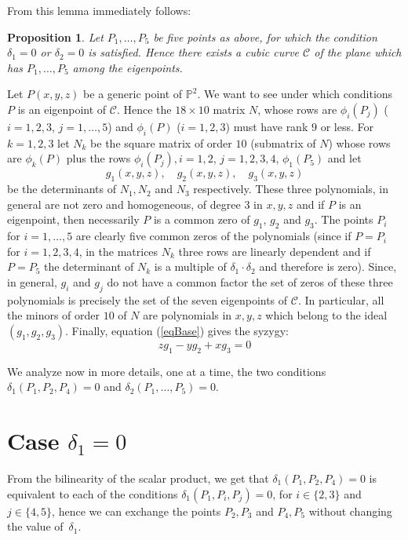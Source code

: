 \documentclass{amsart}
\theoremstyle{plain}
\newtheorem{prop}[theorem]{Proposition}
\theoremstyle{definition}
\begin{document}
{From} this lemma immediately follows:
\begin{prop}
Let $P_1, \dots, P_5$ be five points as above, for which the condition
$\delta_1 = 0$ or $\delta_2 = 0$ is satisfied. Hence
there exists a cubic curve $\mathcal{C}$
of the plane which has $P_1, \dots, P_5$ among the eigenpoints.
\label{d1d2}
\end{prop}
Let $P(x, y, z)$ be a generic point of $\mathbb{P}^2$. We want to
see under which conditions $P$ is an eigenpoint of $\mathcal{C}$.
Hence the $18\times 10$ matrix $N$, whose rows are $\phi_i(P_j)$ ($i=1, 2, 3$,
$j = 1, \dots, 5$) and $\phi_i(P)$ ($i = 1, 2, 3$) must have rank $9$ or
less.
For $k = 1, 2, 3$ let $N_k$ be the square matrix of order $10$
(submatrix of $N$) whose rows are $\phi_k(P)$ plus the rows
$\phi_i(P_j), i = 1, 2$, $j = 1, 2, 3, 4$, $\phi_1(P_5)$ and let
\begin{equation}
  g_1(x, y, z), \quad g_2(x, y, z), \quad g_3(x, y, z)
  \label{geiser}
\end{equation}
be the determinants of $N_1, N_2$ and $N_3$ respectively.
These three polynomials, in general are not zero and homogeneous, of
degree $3$ in $x, y, z$ and
if $P$ is an eigenpoint, then necessarily $P$ is a common zero of
$g_1$, $g_2$ and $g_3$. The points $P_i$ for $i = 1, \dots, 5$
are clearly five common zeros of the
polynomials (since if $P = P_i$ for $i=1, 2, 3, 4$, in the matrices
$N_k$ three rows are linearly dependent and if $P = P_5$ the determinant
of $N_k$ is a multiple of $\delta_1\cdot \delta_2$ and therefore is
zero). Since, in general, $g_i$ and $g_j$ do not have a common
factor the set of zeros of these three polynomials is precisely the set
of the seven eigenpoints of $\mathcal{C}$. In particular, all the minors of
order $10$ of $N$ are polynomials in $x, y, z$ which belong to the ideal
$(g_1, g_2, g_3)$. Finally, equation (\ref{eqBase}) gives the syzygy:
\[
z g_1-yg_2+xg_3 = 0
\]

We analyze now in more details, one at a time, the two conditions
$\delta_1(P_1, P_2, P_4) =0$ and $\delta_2(P_1, \dots, P_5) = 0$.

\section{Case $\delta_1=0$}
{From} the bilinearity of the scalar product, we get that
$\delta_1(P_1, P_2, P_4)=0$ is equivalent to each of the conditions
$\delta_1(P_1, P_i, P_j)=0$, for $i \in \{2, 3\}$ and $j \in \{4, 5\}$,
hence we can exchange the points $P_2, P_3$ and $P_4, P_5$ without
changing the value of~$\delta_1$.
\end{document}
